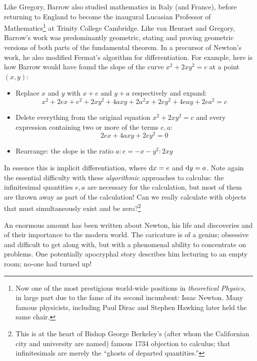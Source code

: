  Like Gregory, Barrow also studied mathematics in Italy (and France), before returning to England to become the inaugural Lucasian Professor of Mathematics\footnote{Now one of the most prestigious world-wide positions in \emph{theoretical Physics,} in large part due to the fame of its second incumbent: Issac Newton. Many famous physicists, including Paul Dirac and Stephen Hawking later held the same chair.} at Trinity College Cambridge. Like van Heuraet and Gregory, Barrow's work was predominantly geometric, stating and proving geometric versions of both parts of the fundamental theorem. In a precursor of Newton's work, he also modified Fermat's algorithm for differentiation. For example, here is how Barrow would have found the slope of the curve $x^2+2xy^2=c$ at a point $(x,y)$:
\begin{itemize}\itemsep0pt
  \item Replace $x$ and $y$ with $x+e$ and $y+a$ respectively and expand:
  \[x^2+2ex+e^2+2xy^2+4axy+2a^2x+2ey^2+4eay+2ea^2=c\]
  \item Delete everything from the original equation $x^2+2xy^2=c$ and every expression containing two or more of the terms $e,a$:
  \[2ex+4axy+2ey^2=0\]
  \item Rearrange: the slope is the ratio $a:e=-x-y^2:2xy$
\end{itemize}
In essence this is implicit differentiation, where ${\mathrm{d} x}=e$ and ${\mathrm{d} y}=a$. Note again the essential difficulty with these \emph{algorithmic} approaches to calculus: the infinitesimal quantities $e,a$ are necessary for the calculation, but most of them are thrown away as part of the calculation! Can we really calculate with objects that must simultaneously exist and be zero?\footnote{This is at the heart of Bishop George Berkeley's (after whom the Californian city and university are named) famous 1734 objection to calculus; that infinitesimals are merely the ``ghosts of departed quantities.''}


% 


 An enormous amount has been written about Newton, his life and discoveries and of their importance to the modern world. The caricature is of a genius; obsessive and difficult to get along with, but with a phenomenal ability to concentrate on problems. One potentially apocryphal story describes him lecturing to an empty room; no-one had turned up!\par


